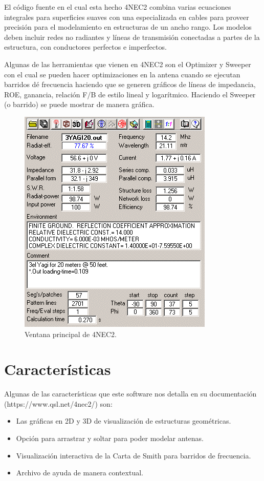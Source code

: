 \documentclass[12pt]{article}
\begin{document}
El código fuente en el cual esta hecho 4NEC2 combina varias ecuaciones
integrales para superficies suaves con una especializada en cables para proveer
precisión para el modelamiento en estructuras de un ancho rango. Los modelos
deben incluir redes no radiantes y líneas de transmisión conectadas a partes de
la estructura, con conductores perfectos e imperfectos.

Algunas de las herramientas que vienen en 4NEC2 son el Optimizer y Sweeper con
el cual se pueden hacer optimizaciones en la antena cuando se ejecutan barridos
dé frecuencia haciendo que se generen gráficos de líneas de impedancia, ROE,
ganancia, relación F/B de estilo lineal y logarítmico. Haciendo el Sweeper (o
barrido) se puede mostrar de manera gráfica.

\begin{figure}[H]
\centering
\includegraphics[width=.4\linewidth]{images/image002.png}
\caption{Ventana principal de 4NEC2.}
\end{figure}

\section{Características}

Algunas de las características que este software nos detalla en su
documentación (https://www\-.qsl.net/4nec2/) son:

\begin{itemize}
\item Las gráficas en 2D y 3D de visualización de estructuras geométricas.
\item Opción para arrastrar y soltar para poder modelar antenas.
\item Visualización interactiva de la Carta de Smith para barridos de
frecuencia.
\item Archivo de ayuda de manera contextual.
\end{itemize}
\end{document}

